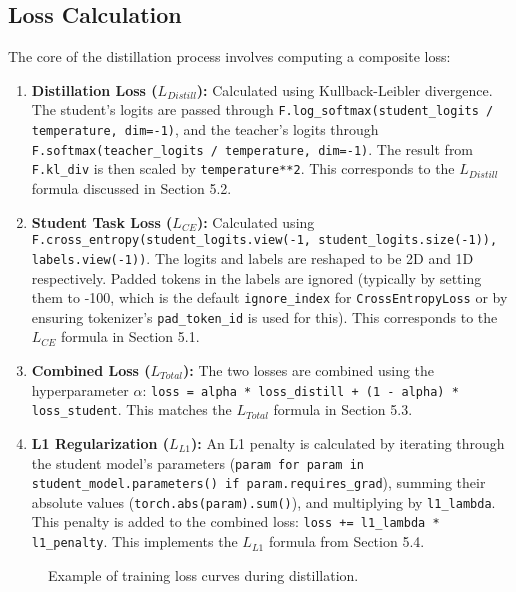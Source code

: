 \documentclass{article}
\begin{document}
\subsection{Loss Calculation}
The core of the distillation process involves computing a composite loss:
\begin{enumerate}
    \item \textbf{Distillation Loss ($L_{Distill}$):}
    Calculated using Kullback-Leibler divergence. The student's logits are passed through \texttt{F.log\_softmax(student\_logits / temperature, dim=-1)}, and the teacher's logits through \texttt{F.softmax(teacher\_logits / temperature, dim=-1)}. The result from \texttt{F.kl\_div} is then scaled by \texttt{temperature**2}. This corresponds to the $L_{Distill}$ formula discussed in Section 5.2.
    \item \textbf{Student Task Loss ($L_{CE}$):}
    Calculated using \texttt{F.cross\_entropy(student\_logits.view(-1, student\_logits.size(-1)), labels.view(-1))}. The logits and labels are reshaped to be 2D and 1D respectively. Padded tokens in the labels are ignored (typically by setting them to -100, which is the default \texttt{ignore\_index} for \texttt{CrossEntropyLoss} or by ensuring tokenizer's \texttt{pad\_token\_id} is used for this). This corresponds to the $L_{CE}$ formula in Section 5.1.
    \item \textbf{Combined Loss ($L_{Total}$):}
    The two losses are combined using the hyperparameter $\alpha$: \texttt{loss = alpha * loss\_distill + (1 - alpha) * loss\_student}. This matches the $L_{Total}$ formula in Section 5.3.
    \item \textbf{L1 Regularization ($L_{L1}$):}
    An L1 penalty is calculated by iterating through the student model's parameters (\texttt{param for param in student\_model.parameters() if param.requires\_grad}), summing their absolute values (\texttt{torch.abs(param).sum()}), and multiplying by \texttt{l1\_lambda}. This penalty is added to the combined loss: \texttt{loss += l1\_lambda * l1\_penalty}. This implements the $L_{L1}$ formula from Section 5.4.
\end{enumerate}

\begin{figure}[h!]
\centering
\caption{Example of training loss curves during distillation.}
\label{fig:loss_curve}
\end{figure}
\end{document}

